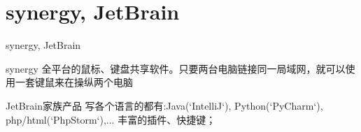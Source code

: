 \documentclass[color=usenames,dvipsnames]{beamer}
\begin{document}
\section{synergy, JetBrain}
\begin{frame}{synergy, JetBrain}
 \begin{block}{synergy}
  全平台的鼠标、键盘共享软件。只要两台电脑链接同一局域网，就可以使用一套键鼠来在操纵两个电脑
 \end{block}

 \begin{block}{JetBrain家族产品}
  写各个语言的都有:Java(`IntelliJ`), Python(`PyCharm`), php/html(`PhpStorm`),...
  丰富的插件、快捷键；
 \end{block}
\end{frame}
\end{document}
